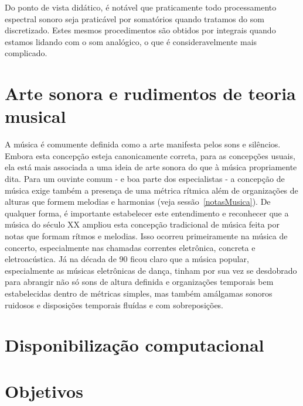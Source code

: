 Do ponto de vista didático, é notável que praticamente todo processamento espectral sonoro seja praticável por somatórios quando tratamos do som discretizado. Estes mesmos procedimentos são obtidos por integrais quando estamos lidando com o som analógico, o que é consideravelmente mais complicado.




    \section{Arte sonora e rudimentos de teoria musical}

A música é comumente definida como a arte manifesta pelos sons e silêncios. Embora esta concepção esteja canonicamente correta, para as concepções usuais, ela está mais associada a uma ideia de arte sonora do que à música propriamente dita. Para um ouvinte comum - e boa parte dos especialistas - a concepção de música exige também a presença de uma métrica rítmica além de organizações de alturas que formem melodias e harmonias (veja sessão~\ref{notasMusica}). De qualquer forma, é importante estabelecer este entendimento e reconhecer que a música do século XX ampliou esta concepção tradicional de música feita por notas que formam rítmos e melodias. Isso ocorreu primeiramente na música de concerto, especialmente nas chamadas correntes eletrônica, concreta e eletroacústica. Já na década de 90 ficou claro que a música popular, especialmente as músicas eletrônicas de dança, tinham por sua vez se desdobrado para abrangir não só sons de altura definida e organizações temporais bem estabelecidas dentro de métricas simples, mas também amálgamas sonoros ruidosos e disposições temporais fluídas e com sobreposições.





    \section{Disponibilização computacional}

    \section{Objetivos}
   \label{sec:objetivos}
